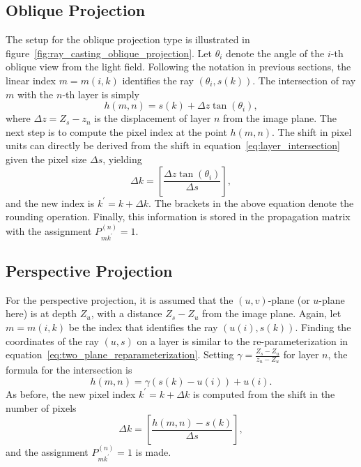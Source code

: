 \subsection*{Oblique Projection}

The setup for the oblique projection type is illustrated in figure~\ref{fig:ray_casting_oblique_projection}.
Let $\theta_i$ denote the angle of the \mbox{$i$-th} oblique view from the light field.
Following the notation in previous sections, the linear index $m = m(i, k)$ identifies the ray $(\theta_i, s(k))$.
The intersection of ray $m$ with the \mbox{$n$-th} layer is simply
\begin{equation}\label{eq:layer_intersection}
	h(m, n) = s(k) + \Delta z \tan (\theta_i), 
\end{equation}
where $\Delta z = Z_s - z_n$ is the displacement of layer $n$ from the image plane.
The next step is to compute the pixel index at the point $h(m, n)$.
The shift in pixel units can directly be derived from the shift in equation~\ref{eq:layer_intersection} given the pixel size $\Delta s$, yielding
\begin{equation}
	\Delta k = \left[ \frac{\Delta z \tan (\theta_i)}{\Delta s} \right],
\end{equation}
and the new index is $k^\prime = k + \Delta k$.
The brackets in the above equation denote the rounding operation.
Finally, this information is stored in the propagation matrix with the assignment $P_{m k^\prime}^{(n)} = 1$.

\subsection*{Perspective Projection}

For the perspective projection, it is assumed that the \mbox{$(u, v)$-plane} (or \mbox{$u$-plane} here) is at depth $Z_u$, with a distance $Z_s - Z_u$ from the image plane.
Again, let $m = m(i, k)$ be the index that identifies the ray $(u(i), s(k))$.
Finding the coordinates of the ray $(u, s)$ on a layer is similar to the re-parameterization in equation~\ref{eq:two_plane_reparameterization}.
Setting $\gamma = \frac{Z_s - Z_u}{z_n - Z_u}$ for layer $n$, the formula for the intersection is
\begin{equation}
	h(m, n) = \gamma (s(k) - u(i)) + u(i).
\end{equation}
As before, the new pixel index $k^\prime = k + \Delta k$ is computed from the shift in the number of pixels
\begin{equation}
	\Delta k = \left[ \frac{h(m, n) - s(k)}{\Delta s} \right], 
\end{equation}
and the assignment $P_{m k^\prime}^{(n)} = 1$ is made.

